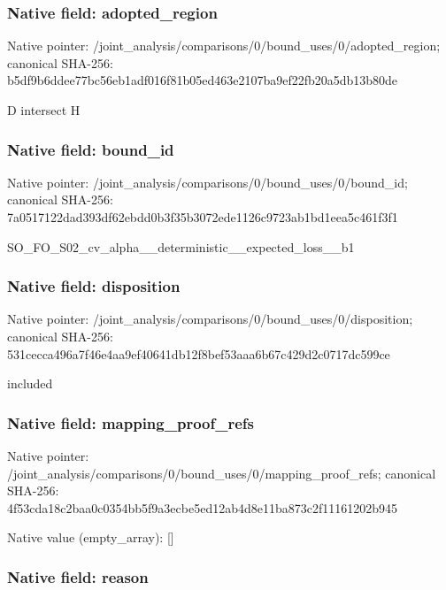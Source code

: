 \documentclass[10pt,a4paper]{article}
\begin{document}
\subsubsection{Native field: adopted\_region}


Native pointer: /joint\_analysis/comparis\allowbreak{}ons/0/bound\_uses/0/adopt\allowbreak{}ed\_region; canonical SHA-256: b5df9b6ddee77bc56eb1adf0\allowbreak{}16f81b05ed463e2107ba9ef2\allowbreak{}2fb20a5db13b80de


D intersect H


\subsubsection{Native field: bound\_id}


Native pointer: /joint\_analysis/comparis\allowbreak{}ons/0/bound\_uses/0/bound\allowbreak{}\_id; canonical SHA-256: 7a0517122dad393df62ebdd0\allowbreak{}b3f35b3072ede1126c9723ab\allowbreak{}1bd1eea5c461f3f1


SO\_FO\_S02\_cv\_alpha\_\_dete\allowbreak{}rministic\_\_expected\_loss\allowbreak{}\_\_b1


\subsubsection{Native field: disposition}


Native pointer: /joint\_analysis/comparis\allowbreak{}ons/0/bound\_uses/0/dispo\allowbreak{}sition; canonical SHA-256: 531cecca496a7f46e4aa9ef4\allowbreak{}0641db12f8bef53aaa6b67c4\allowbreak{}29d2c0717dc599ce


included


\subsubsection{Native field: mapping\_proof\_refs}


Native pointer: /joint\_analysis/comparis\allowbreak{}ons/0/bound\_uses/0/mappi\allowbreak{}ng\_proof\_refs; canonical SHA-256: 4f53cda18c2baa0c0354bb5f\allowbreak{}9a3ecbe5ed12ab4d8e11ba87\allowbreak{}3c2f11161202b945



Native value (empty\_array): []



\subsubsection{Native field: reason}
\end{document}
